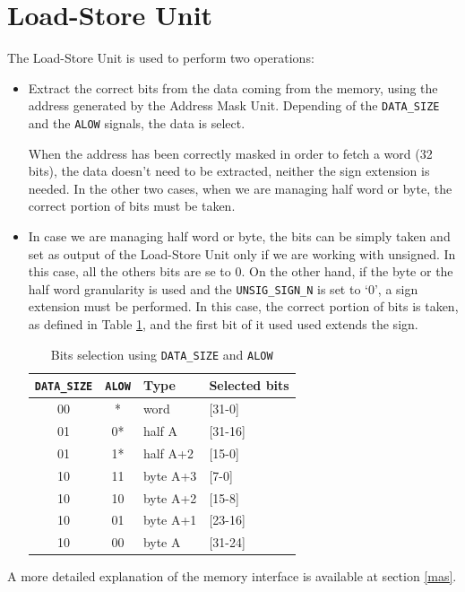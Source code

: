 \section{Load-Store Unit}
The Load-Store Unit is used to perform two operations:
\begin{itemize}
	\item Extract the correct bits from the data coming from the memory, using the address generated by the Address Mask Unit. Depending of the \texttt{DATA\_SIZE} and the \texttt{ALOW} signals, the data is select.
	
	When the address has been correctly masked in order to fetch a word (32 bits), the data doesn't need to be extracted, neither the sign extension is needed. In the other two cases, when we are managing half word or byte, the correct portion of bits must be taken. 

	\item In case we are managing half word or byte, the bits can be simply taken and set as output of the Load-Store Unit only if we are working with unsigned. In this case, all the others bits are se to 0. On the other hand, if the byte or the half word granularity is used and the \texttt{UNSIG\_SIGN\_N} is set to `0', a sign extension must be performed. In this case, the correct portion of bits is taken, as defined in Table \ref{tab:addr_selection}, and the first bit of it used used extends the sign. 
	\begin{table}[H]
		\begin{center}
			\begin{tabular}{ |c| c | l | l|}
				\hline
				\texttt{DATA\_SIZE} & \texttt{ALOW} & \textbf{Type} & \textbf{Selected bits}\\
				\hline
				00 & * & word & [31-0]\\
				01 & 0* & half A & [31-16]\\
				01 & 1* & half A+2 & [15-0]\\
				10 & 11 & byte A+3 & [7-0]\\
				10 & 10 & byte A+2 & [15-8]\\
				10 & 01 & byte A+1 & [23-16]\\
				10 & 00 & byte A & [31-24]\\
				\hline
				
			\end{tabular}
			\caption{Bits selection using \texttt{DATA\_SIZE} and \texttt{ALOW}}
			\label{tab:addr_selection}
		\end{center}
	\end{table}

	
\end{itemize}
A more detailed explanation of the memory interface is available at section \ref{mas}.